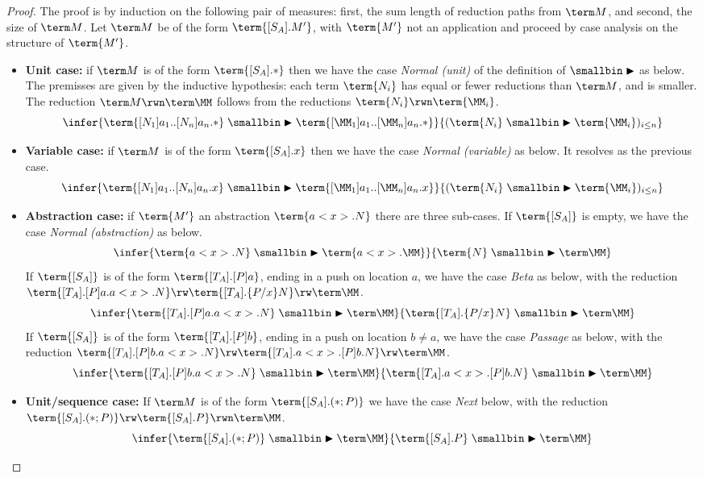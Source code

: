 \documentclass[10pt,a4paper]{amsart}
\newcommand\case[1]{\textbf{#1}}
\newcommand\rp{\mathrel{\smallbin\blacktriangleright}}
\begin{document}
\begin{proof}
The proof is by induction on the following pair of measures: first, the sum length of reduction paths from $\term M$, and second, the size of $\term M$. Let $\term M$ be of the form $\term{[S_A].M'}$, with $\term{M'}$ not an application and proceed by case analysis on the structure of $\term{M'}$.
\begin{itemize}
	
	\item\case{Unit case:} if $\term M$ is of the form $\term{[S_A].*}$ then we have the case \emph{Normal (unit)} of the definition of $\rp$ as below. The premisses are given by the inductive hypothesis: each term $\term{N_i}$ has equal or fewer reductions than $\term M$, and is smaller. The reduction $\term M\rwn\term\MM$ follows from the reductions $\term{N_i}\rwn\term{\MM_i}$.
\[
\infer{\term{[N_1]a_1..[N_n]a_n.*} \rp \term{[\MM_1]a_1..[\MM_n]a_n.*}}{(\term{N_i}\rp\term{\MM_i})_{i\leq n}}
\]

	\item\case{Variable case:} if $\term M$ is of the form $\term{[S_A].x}$ then we have the case \emph{Normal (variable)} as below. It resolves as the previous case.
\[
\infer{\term{[N_1]a_1..[N_n]a_n.x} \rp \term{[\MM_1]a_1..[\MM_n]a_n.x}}{(\term{N_i}\rp\term{\MM_i})_{i\leq n}}
\]

	\item\case{Abstraction case:} if $\term{M'}$ an abstraction $\term{a<x>.N}$ there are three sub-cases. If $\term{[S_A]}$ is empty, we have the case \emph{Normal (abstraction)} as below.
\[
\infer{\term{a<x>.N}\rp\term{a<x>.\MM}}{\term{N}\rp\term \MM}
\]
If $\term{[S_A]}$ is of the form $\term{[T_A].[P]a}$, ending in a push on location $a$, we have the case \emph{Beta} as below, with the reduction $\term{[T_A].[P]a.a<x>.N}\rw\term{[T_A].\{P/x\}N}\rw\term\MM$.
\[
\infer{\term{[T_A].[P]a.a<x>.N}\rp\term\MM}{\term{[T_A].\{P/x\}N}\rp\term\MM}
\]
If $\term{[S_A]}$ is of the form $\term{[T_A].[P]b}$, ending in a push on location $b\neq a$, we have the case \emph{Passage} as below, with the reduction $\term{[T_A].[P]b.a<x>.N}\rw\term{[T_A].a<x>.[P]b.N}\rw\term\MM$.
\[
\infer{\term{[T_A].[P]b.a<x>.N}\rp\term\MM}{\term{[T_A].a<x>.[P]b.N}\rp\term\MM}
\]
	\item\case{Unit/sequence case:}
If $\term M$ is of the form $\term{[S_A].(*;P)}$ we have the case \emph{Next} below, with the reduction $\term{[S_A].(*;P)}\rw\term{[S_A].P}\rwn\term\MM$. 
\[
\infer{\term{[S_A].(*;P)} \rp \term\MM}{\term{[S_A].P}\rp \term\MM}
\]


\end{itemize}
\end{proof}
\end{document}
